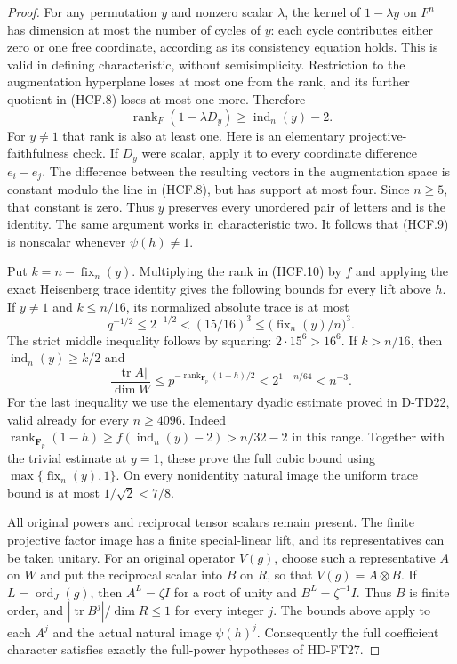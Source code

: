 \begin{proof}
For any permutation $y$ and nonzero scalar $\lambda$, the kernel
of $1-\lambda y$ on $F^n$ has dimension at most the number of
cycles of $y$: each cycle contributes either zero or one free
coordinate, according as its consistency equation holds.
This is valid in defining characteristic, without semisimplicity.
Restriction to the augmentation hyperplane loses at most one
from the rank, and its further quotient in (HCF.8) loses at
most one more.  Therefore
\[
 \operatorname{rank}_{F}(1-\lambda D_y)
                  \ge\operatorname{ind}_n(y)-2.
 \tag{HCF.10}
\]
For $y\ne1$ that rank is also at least one.  Here is an elementary
projective-faithfulness check.  If $D_y$ were scalar, apply it to
every coordinate difference $e_i-e_j$.  The difference between
the resulting vectors in the augmentation space is constant
modulo the line in (HCF.8), but has support at most four.
Since $n\ge5$, that constant is zero.  Thus $y$ preserves every
unordered pair of letters and is the identity.  The same argument
works in characteristic two.  It follows that (HCF.9) is nonscalar
whenever $\psi(h)\ne1$.

Put $k=n-\operatorname{fix}_n(y)$.  Multiplying the rank in
(HCF.10) by $f$ and applying the exact Heisenberg trace identity
gives the following bounds for every lift above $h$.
If $y\ne1$ and $k\le n/16$, its normalized absolute trace is
at most
\[
 q^{-1/2}\le2^{-1/2}< (15/16)^3
                  \le\bigl(\operatorname{fix}_n(y)/n\bigr)^3.
 \tag{HCF.11}
\]
The strict middle inequality follows by squaring:
$2\cdot15^6>16^6$.
If $k>n/16$, then $\operatorname{ind}_n(y)\ge k/2$ and
\[
 \frac{|\operatorname{tr}A|}{\dim W}
    \le p^{-\operatorname{rank}_{\mathbf F_p}(1-h)/2}
    <2^{1-n/64}<n^{-3}.
 \tag{HCF.12}
\]
For the last inequality we use the elementary dyadic estimate
proved in D-TD22, valid already for every $n\ge4096$.
Indeed $\operatorname{rank}_{\mathbf F_p}(1-h)
\ge f(\operatorname{ind}_n(y)-2)>n/32-2$ in this range.
Together with the trivial estimate at $y=1$, these prove the
full cubic bound using $\max\{\operatorname{fix}_n(y),1\}$.
On every nonidentity natural image the uniform trace bound
is at most $1/\sqrt2<7/8$.

All original powers and reciprocal tensor scalars remain present.
The finite projective factor image has a finite special-linear
lift, and its representatives can be taken unitary.  For an
original operator $V(g)$, choose such a representative $A$ on
$W$ and put the reciprocal scalar into $B$ on $R$, so that
$V(g)=A\otimes B$.  If $L=\operatorname{ord}_J(g)$, then
$A^L=\zeta I$ for a root of unity and $B^L=\zeta^{-1}I$.
Thus $B$ is finite order, and
$|\operatorname{tr}B^j|/\dim R\le1$ for every integer $j$.
The bounds above apply to each $A^j$ and the actual natural
image $\psi(h)^j$.  Consequently the full coefficient character
satisfies exactly the full-power hypotheses of HD-FT27.


\end{proof}
